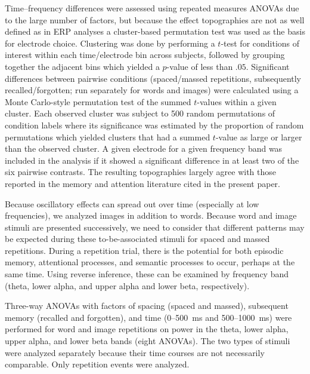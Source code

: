 Time--frequency differences were assessed using repeated measures ANOVAs due to the large number of factors, but because the effect topographies are not as well defined as in ERP analyses a cluster-based permutation test \cite{MariOost2007} was used as the basis for electrode choice.  Clustering was done by performing a $t$-test for conditions of interest within each time/electrode bin across subjects, followed by grouping together the adjacent bins which yielded a $p$-value of less than $.05$.  Significant differences between pairwise conditions (spaced/massed repetitions, subsequently recalled/forgotten; run separately for words and images) were calculated using a Monte Carlo-style permutation test of the summed $t$-values within a given cluster.  Each observed cluster was subject to 500 random permutations of condition labels where its significance was estimated by the proportion of random permutations which yielded clusters that had a summed $t$-value as large or larger than the observed cluster.  A given electrode for a given frequency band was included in the analysis if it showed a significant difference in at least two of the six pairwise contrasts.  The resulting topographies largely agree with those reported in the memory and attention literature cited in the present paper.




Because oscillatory effects can spread out over time (especially at low frequencies), we analyzed images in addition to words.
Because word and image stimuli are presented successively, we need to consider that different patterns may be expected during these to-be-associated stimuli for spaced and massed repetitions.  During a repetition trial, there is the potential for both episodic memory, attentional processes, and semantic processes to occur, perhaps at the same time.  Using reverse inference, these can be examined by frequency band (theta, lower alpha, and upper alpha and lower beta, respectively).

Three-way ANOVAs with factors of spacing (spaced and massed), subsequent memory (recalled and forgotten), and time (0--500~ms and 500--1000~ms) were performed for word and image repetitions on power in the theta, lower alpha, upper alpha, and lower beta bands (eight ANOVAs).  The two types of stimuli were analyzed separately because their time courses are not necessarily comparable.  Only repetition events were analyzed.

